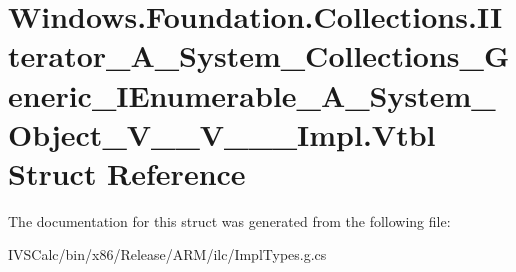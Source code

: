 \hypertarget{struct_windows_1_1_foundation_1_1_collections_1_1_i_iterator___a___system___collections___generib79f709ae40fd5754d97bbac81a07b49}{}\section{Windows.\+Foundation.\+Collections.\+I\+Iterator\+\_\+\+A\+\_\+\+System\+\_\+\+Collections\+\_\+\+Generic\+\_\+\+I\+Enumerable\+\_\+\+A\+\_\+\+System\+\_\+\+Object\+\_\+\+V\+\_\+\+\_\+\+V\+\_\+\+\_\+\+\_\+\+Impl.\+Vtbl Struct Reference}
\label{struct_windows_1_1_foundation_1_1_collections_1_1_i_iterator___a___system___collections___generib79f709ae40fd5754d97bbac81a07b49}


The documentation for this struct was generated from the following file\+:\begin{DoxyCompactItemize}
\item 
I\+V\+S\+Calc/bin/x86/\+Release/\+A\+R\+M/ilc/Impl\+Types.\+g.\+cs\end{DoxyCompactItemize}
